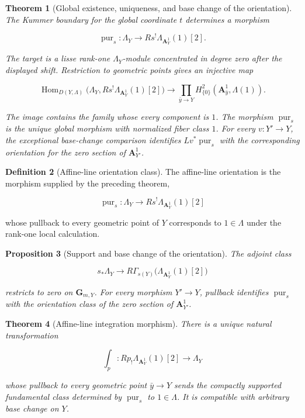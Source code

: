 \documentclass[10pt]{article}
\newtheorem{theorem}{Theorem}[section]
\newtheorem{proposition}[theorem]{Proposition}
\theoremstyle{definition}
\newtheorem{definition}[theorem]{Definition}
\begin{document}
\begin{theorem}[Global existence, uniqueness, and base change of the orientation]
The Kummer boundary for the global coordinate \(t\) determines a morphism

\[
 \operatorname{pur}_s:\Lambda_Y
 \longrightarrow Rs^!\Lambda_{\mathbf A^1_Y}(1)[2].
\]

The target is a lisse rank-one \(\Lambda_Y\)-module concentrated in degree
zero after the displayed shift.  Restriction to geometric points gives an
injective map

\[
 \operatorname{Hom}_{D(Y,\Lambda)}
 \bigl(\Lambda_Y,Rs^!\Lambda_{\mathbf A^1_Y}(1)[2]\bigr)
 \longrightarrow
 \prod_{\bar y\to Y}
 H^2_{\{0\}}(\mathbf A^1_{\bar y},\Lambda(1)).
\]

The image contains the family whose every component is \(1\).
The morphism \(\operatorname{pur}_s\) is the unique global morphism with normalized fiber
class \(1\).  For every \(v:Y'\to Y\), the exceptional base-change
comparison identifies \(Lv^*\operatorname{pur}_s\) with the corresponding
orientation for the zero section of \(\mathbf A^1_{Y'}\).
\end{theorem}

\begin{definition}[Affine-line orientation class]
The affine-line orientation is the morphism supplied by the preceding
theorem,

\[
 \operatorname{pur}_s:\Lambda_Y
 \longrightarrow Rs^!\Lambda_{\mathbf A^1_Y}(1)[2]
\]

whose pullback to every geometric point of \(Y\) corresponds to
\(1\in\Lambda\) under the rank-one local calculation.
\end{definition}

\begin{proposition}[Support and base change of the orientation]
The adjoint class

\[
 s_*\Lambda_Y\longrightarrow
 R\Gamma_{s(Y)}\bigl(\Lambda_{\mathbf A^1_Y}(1)[2]\bigr)
\]

restricts to zero on \(\mathbf G_{m,Y}\).  For every morphism \(Y'\to Y\),
pullback identifies \(\operatorname{pur}_s\) with the orientation class of
the zero section of \(\mathbf A^1_{Y'}\).
\end{proposition}

\begin{theorem}[Affine-line integration morphism]
There is a unique natural transformation

\[
 \int_p:Rp_!\Lambda_{\mathbf A^1_Y}(1)[2]\longrightarrow\Lambda_Y
\]

whose pullback to every geometric point \(\bar y\to Y\) sends the compactly
supported fundamental class determined by \(\operatorname{pur}_s\) to
\(1\in\Lambda\).  It is compatible with arbitrary base change on \(Y\).
\end{theorem}
\end{document}
